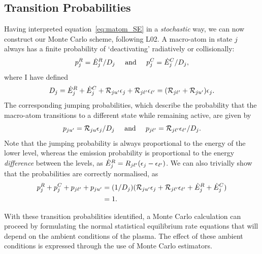 
\subsection{Transition Probabilities}

Having interpreted equation~\ref{eq:matom_SE} in a {\em stochastic} way,
we can now construct our Monte Carlo scheme, following L02.
A macro-atom in state $j$ always has a finite probability of `deactivating'
radiatively or collisionally:
\begin{equation}
p_{j}^{R} = \dot{E}_{j}^{R} / D_j \;\;\;\;\; {\rm and} \;\;\;
\;\; p_{j}^{C} = \dot{E}_{j}^{C} / D_j,
\label{eq:deactivate}
\end{equation}
where I have defined
\begin{equation}
D_j =  \dot{E}_{j}^{R}+\dot{E}_{j}^{C}+{\cal R}_{j{u^\prime}}\epsilon_{j}+
 {\cal R}_{j {\ell^\prime}}\epsilon_{{\ell^\prime}} = ({\cal R}_{j{\ell^\prime}} + {\cal R}_{j{u^\prime}}) \epsilon_{j}.
\end{equation}
The corresponding jumping probabilities, which describe the probability
that the macro-atom transitions to a different state while remaining active, 
are given by
\begin{equation}
p_{j{u^\prime}} = {\cal R}_{ju} \epsilon_{j} / D_j \;\;\;\;\; {\rm and} \;\;\;
\;\; p_{j{\ell^\prime}} = {\cal R}_{j{\ell^\prime}} \epsilon_{{\ell^\prime}} / D_j.
\end{equation}
Note that the jumping probability is always proportional to the energy
of the lower level, whereas the emission probability is proportional
to the energy {\em difference} between the levels, as 
$\dot{E}_{j}^{R} = R_{j{\ell^\prime}} (\epsilon_j - \epsilon_{\ell^\prime})$. We can also
trivially show that the probabilities are correctly normalised, as
\begin{align}
p_{j}^{R} + p_{j}^{C} + p_{j{\ell^\prime}} + p_{j{u^\prime}} &=
(1/D_j) ( {\cal R}_{j{u^\prime}} \epsilon_{j} + {\cal R}_{j{\ell^\prime}} \epsilon_{{\ell^\prime}} +
\dot{E}_{j}^{R} + \dot{E}_{j}^{C}) \\
&= 1. \nonumber
\end{align}

With these transition
probabilities identified, a Monte Carlo calculation can proceed by formulating
the normal statistical equilibrium rate equations that will depend on
the ambient conditions of the plasma. The effect of these ambient conditions
is expressed through the use of Monte Carlo estimators.





